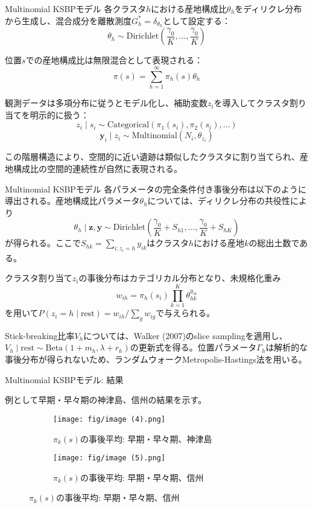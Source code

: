 \documentclass[xelatex, 8pt]{beamer}
\theoremstyle{plain}
\theoremstyle{definition}
\begin{document}
\begin{frame}{Multinomial KSBPモデル}
    各クラスタ$h$における産地構成比$\theta_h$をディリクレ分布から生成し、混合成分を離散測度$G_h^* = \delta_{\theta_h}$として設定する：
    $$\theta_h \sim \text{Dirichlet}\left(\frac{\gamma_0}{K}, \ldots, \frac{\gamma_0}{K}\right)$$

    位置$s$での産地構成比は無限混合として表現される：
    $$\pi(s) = \sum_{h=1}^{\infty} \pi_h(s) \theta_h$$

    観測データは多項分布に従うとモデル化し、補助変数$z_i$を導入してクラスタ割り当てを明示的に扱う：
    $$z_i \mid s_i \sim \text{Categorical}(\pi_1(s_i), \pi_2(s_i), \ldots)$$
    $$\mathbf{y}_i \mid z_i \sim \text{Multinomial}(N_i, \theta_{z_i})$$

    この階層構造により、空間的に近い遺跡は類似したクラスタに割り当てられ、産地構成比の空間的連続性が自然に表現される。
\end{frame}

\begin{frame}{Multinomial KSBPモデル}
    各パラメータの完全条件付き事後分布は以下のように導出される。産地構成比パラメータ$\theta_h$については、ディリクレ分布の共役性により
    $$\theta_h \mid \mathbf{z}, \mathbf{y} \sim \text{Dirichlet}\left(\frac{\gamma_0}{K} + S_{h1}, \ldots, \frac{\gamma_0}{K} + S_{hK}\right)$$
    が得られる。ここで$S_{hk} = \sum_{i:z_i=h} y_{ik}$はクラスタ$h$における産地$k$の総出土数である。

    クラスタ割り当て$z_i$の事後分布はカテゴリカル分布となり、未規格化重み
    $$w_{ih} = \pi_h(s_i) \prod_{k=1}^K \theta_{hk}^{y_{ik}}$$
    を用いて$P(z_i = h \mid \text{rest}) = w_{ih}/\sum_g w_{ig}$で与えられる。

    Stick-breaking比率$V_h$については、Walker (2007)のslice samplingを適用し、$V_h \mid \text{rest} \sim \text{Beta}(1+m_h, \lambda+r_h)$の更新式を得る。位置パラメータ$\Gamma_h$は解析的な事後分布が得られないため、ランダムウォークMetropolis-Hastings法を用いる。
\end{frame}

\begin{frame}{Multinomial KSBPモデル: 結果}

例として早期・早々期の神津島、信州の結果を示す。


\begin{figure}
    \centering
    \begin{subfigure}{0.49\textwidth}
        \centering
        \texttt{[image: fig/image (4).png]}
        \caption{$\pi_k(s)$の事後平均: 早期・早々期、神津島}
        \label{fig:pointprocess1}
    \end{subfigure}
    \hfill
    \begin{subfigure}{0.49\textwidth}
        \centering
        \texttt{[image: fig/image (5).png]}
        \caption{$\pi_k(s)$の事後平均: 早期・早々期、信州}
        \label{fig:pointprocess2}
    \end{subfigure}
    \label{fig:both-predictions}
\end{figure}

\end{frame}
\end{document}
